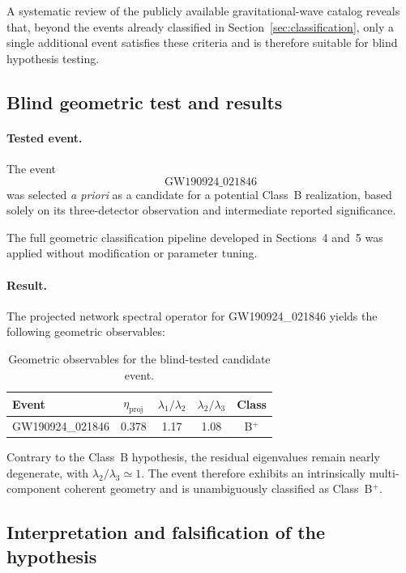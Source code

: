 \documentclass[11pt,a4paper]{article}
\begin{document}
A systematic review of the publicly available gravitational-wave catalog reveals that,
beyond the events already classified in Section~\ref{sec:classification}, only a single additional event
satisfies these criteria and is therefore suitable for blind hypothesis testing.

\subsection{Blind geometric test and results}

\paragraph{Tested event.}
The event
\[
\text{GW190924\_021846}
\]
was selected \emph{a priori} as a candidate for a potential Class~B realization, based
solely on its three-detector observation and intermediate reported significance.

The full geometric classification pipeline developed in Sections~4 and~5 was applied
without modification or parameter tuning.

\paragraph{Result.}
The projected network spectral operator for GW190924\_021846 yields the following
geometric observables:

\begin{table}[t]
\centering
\caption{Geometric observables for the blind-tested candidate event.}
\label{tab:classB_test}
\vspace{0.2cm}
\begin{tabular}{lcccc}
\toprule
Event & $\eta_{\mathrm{proj}}$ & $\lambda_1/\lambda_2$ & $\lambda_2/\lambda_3$ & Class \\
\midrule
GW190924\_021846 & 0.378 & 1.17 & 1.08 & B$^+$ \\
\bottomrule
\end{tabular}
\end{table}

Contrary to the Class~B hypothesis, the residual eigenvalues remain nearly degenerate,
with $\lambda_2/\lambda_3 \simeq 1$.
The event therefore exhibits an intrinsically multi-component coherent geometry and is
unambiguously classified as Class~B$^+$.

\subsection{Interpretation and falsification of the hypothesis}
\end{document}
